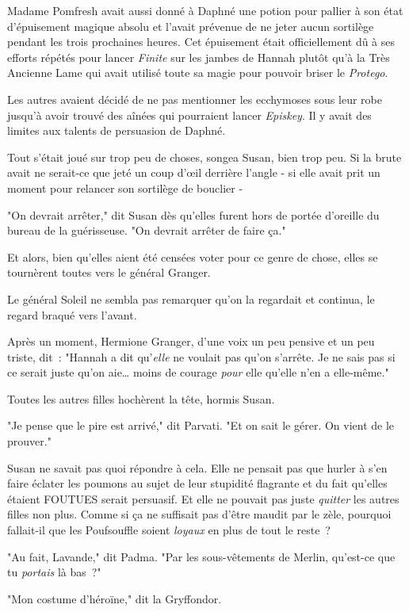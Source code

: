 Madame Pomfresh avait aussi donné à Daphné une potion pour pallier à son état d'épuisement magique absolu et l'avait prévenue de ne jeter aucun sortilège pendant les trois prochaines heures. Cet épuisement était officiellement dû à ses efforts répétés pour lancer \emph{Finite} sur les jambes de Hannah plutôt qu'à la Très Ancienne Lame qui avait utilisé toute sa magie pour pouvoir briser le \emph{Protego}.

Les autres avaient décidé de ne pas mentionner les ecchymoses sous leur robe jusqu'à avoir trouvé des aînées qui pourraient lancer \emph{Episkey}. Il y avait des limites aux talents de persuasion de Daphné.

Tout s'était joué sur trop peu de choses, songea Susan, bien trop peu. Si la brute avait ne serait-ce que jeté un coup d'œil derrière l'angle - si elle avait prit un moment pour relancer son sortilège de bouclier -

"On devrait arrêter," dit Susan dès qu'elles furent hors de portée d'oreille du bureau de la guérisseuse. "On devrait arrêter de faire ça."

Et alors, bien qu'elles aient été censées voter pour ce genre de chose, elles se tournèrent toutes vers le général Granger.

Le général Soleil ne sembla pas remarquer qu'on la regardait et continua, le regard braqué vers l'avant.

Après un moment, Hermione Granger, d'une voix un peu pensive et un peu triste, dit~: "Hannah a dit qu'\emph{elle} ne voulait pas qu'on s'arrête. Je ne sais pas si ce serait juste qu'on aie… moins de courage \emph{pour} elle qu'elle n'en a elle-même."

Toutes les autres filles hochèrent la tête, hormis Susan.

"Je pense que le pire est arrivé," dit Parvati. "Et on sait le gérer. On vient de le prouver."

Susan ne savait pas quoi répondre à cela. Elle ne pensait pas que hurler à s'en faire éclater les poumons au sujet de leur stupidité flagrante et du fait qu'elles étaient FOUTUES serait persuasif. Et elle ne pouvait pas juste \emph{quitter} les autres filles non plus. Comme si ça ne suffisait pas d'être maudit par le zèle, pourquoi fallait-il que les Poufsouffle soient \emph{loyaux} en plus de tout le reste~?

"Au fait, Lavande," dit Padma. "Par les sous-vêtements de Merlin, qu'est-ce que tu \emph{portais} là bas~?"

"Mon costume d'héroïne," dit la Gryffondor.

